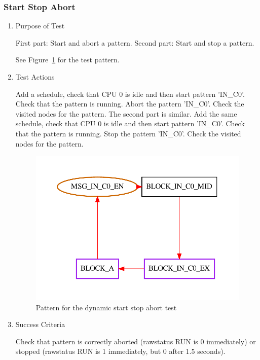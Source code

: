\documentclass[12pt,a4paper]{report}
\begin{document}
\subsubsection{Start Stop Abort}
\begin{enumerate}
	\item Purpose of Test

    First part: Start and abort a pattern. Second part: Start and stop a pattern.

	See Figure~\ref{fig:Pattern_for_the_dynamic_start_stop_abort_test} for the test pattern.
	\item Test Actions
    
    Add a schedule, check that CPU 0 is idle and then start pattern 'IN\_C0'. Check that the pattern is running. 
    Abort the pattern 'IN\_C0'. Check the visited nodes for the pattern. The second part is similar. 
    Add the same schedule, check that CPU 0 is idle and then start pattern 'IN\_C0'. Check that the pattern is running. 
    Stop the pattern 'IN\_C0'. Check the visited nodes for the pattern.
    \begin{figure}
        \centering 
        \includegraphics{TestPattern/dynamic_basic_start_stop_abort.pdf}
        \caption{Pattern for the dynamic start stop abort test}
        \label{fig:Pattern_for_the_dynamic_start_stop_abort_test}
    \end{figure}
	\item Success Criteria

	Check that pattern is correctly aborted (rawstatus RUN is 0 immediately) or 
	stopped (rawstatus RUN is 1 immediately, but 0 after 1.5 seconds).
\end{enumerate}
\end{document}

